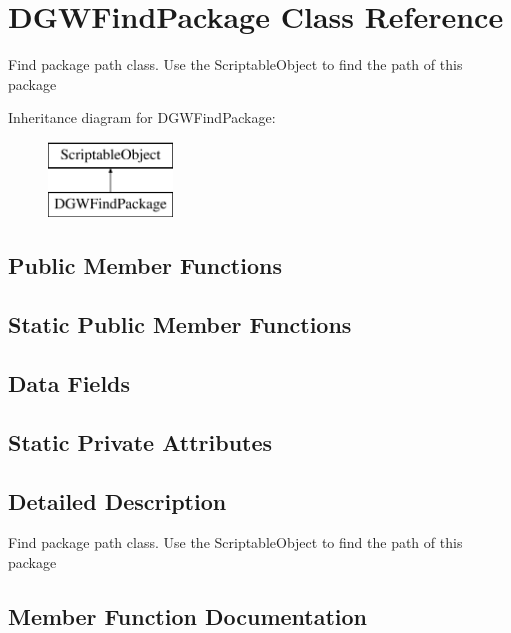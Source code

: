 \hypertarget{classDoxygenGeneratorWindow_1_1DGWFindPackage}{}\section{D\+G\+W\+Find\+Package Class Reference}
\label{classDoxygenGeneratorWindow_1_1DGWFindPackage}


Find package path class. Use the Scriptable\+Object to find the path of this package  


Inheritance diagram for D\+G\+W\+Find\+Package\+:\begin{figure}[H]
\begin{center}
\leavevmode
\includegraphics[height=2.000000cm]{d3/d50/classDoxygenGeneratorWindow_1_1DGWFindPackage}
\end{center}
\end{figure}
\subsection*{Public Member Functions}
\subsection*{Static Public Member Functions}
\subsection*{Data Fields}
\subsection*{Static Private Attributes}


\subsection{Detailed Description}
Find package path class. Use the Scriptable\+Object to find the path of this package 



\subsection{Member Function Documentation}
\mbox{\label{classDoxygenGeneratorWindow_1_1DGWFindPackage_a419068e8651e24c994cf1d34b24dd4b0}} 
